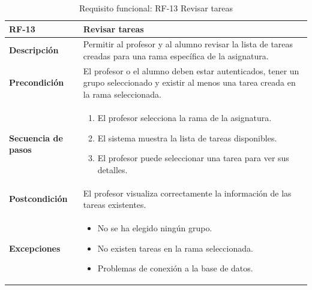 \begin{table}[H]
\centering
\begin{tabularx}{\textwidth}{
  |>{\centering\arraybackslash}l
  |>{\centering\arraybackslash}X|}
\hline
\textbf{RF-13} & \textbf{Revisar tareas} \\ \hline

\textbf{Descripción} & Permitir al profesor y al alumno revisar la lista de tareas creadas para una rama específica de la asignatura. \\ \hline

\textbf{Precondición} & El profesor o el alumno deben estar autenticados, tener un grupo seleccionado y existir al menos una tarea creada en la rama seleccionada. \\ \hline

\textbf{Secuencia de pasos} & 
\begin{enumerate}
  \item El profesor selecciona la rama de la asignatura.
  \item El sistema muestra la lista de tareas disponibles.
  \item El profesor puede seleccionar una tarea para ver sus detalles.
\end{enumerate} \\ \hline

\textbf{Postcondición} & El profesor visualiza correctamente la información de las tareas existentes. \\ \hline

\textbf{Excepciones} & 
\begin{itemize}
  \item No se ha elegido ningún grupo.
  \item No existen tareas en la rama seleccionada.
  \item Problemas de conexión a la base de datos.
\end{itemize} \\ \hline
\end{tabularx}
\caption{Requisito funcional: RF-13 Revisar tareas}
\end{table}


